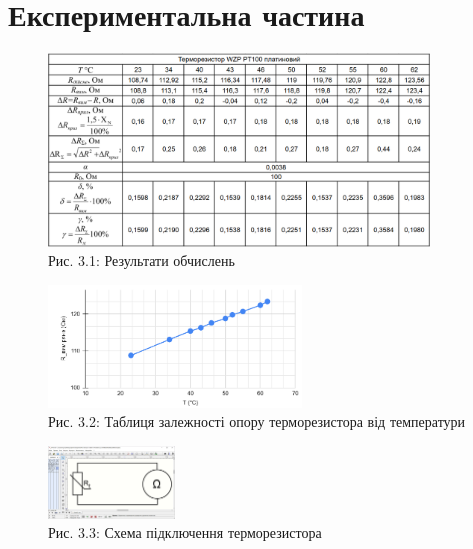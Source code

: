 \documentclass[a4paper]{article}
\begin{document}
\newpage 



\section*{Експериментальна частина}

\begin{figure}[h]
    \centering
\includegraphics[width=0.9\textwidth]{imgs/LW3.1.png}
    \caption*{Рис. 3.1: Результати обчислень}
\end{figure} 

\begin{figure}[h]
    \centering
\includegraphics[width=0.6\textwidth]{imgs/LW3.3.png}
    \caption*{Рис. 3.2: Таблиця залежності опору терморезистора від температури}
\end{figure} 

\begin{figure}[h]
    \centering
\includegraphics[width=0.3\textwidth]{imgs/LW3.2.png}
    \caption*{Рис. 3.3: Схема підключення терморезистора}
\end{figure} 
\end{document}
